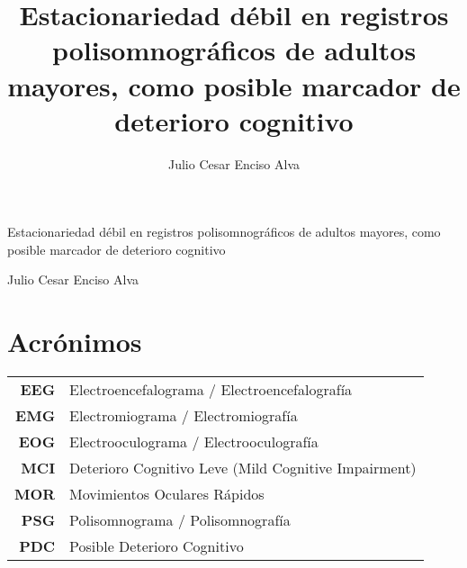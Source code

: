 \documentclass[12pt,a4paper]{mitthesis}
\begin{document}

\title{Estacionariedad d\'ebil en registros polisomnogr\'aficos de adultos mayores,
como posible marcador de deterioro cognitivo}
%
\author{Julio Cesar Enciso Alva}

\begin{center}
\huge{Estacionariedad d\'ebil en registros polisomnogr\'aficos de adultos mayores,
como posible marcador de deterioro cognitivo}


\Large{Julio Cesar Enciso Alva}
\end{center}

\newpage





\chapter*{Acr\'onimos}

\begin{tabular}{rl}
\textbf{EEG} & Electroencefalograma / Electroencefalograf\'ia
\\
\textbf{EMG} & Electromiograma / Electromiograf\'ia
\\
\textbf{EOG} & Electrooculograma / Electrooculograf\'ia
\\
\textbf{MCI} & Deterioro Cognitivo Leve (Mild Cognitive Impairment)
\\
\textbf{MOR} & Movimientos Oculares R\'apidos
\\
\textbf{PSG} & Polisomnograma / Polisomnograf\'ia
\\
\textbf{PDC} & Posible Deterioro Cognitivo
\end{tabular}

\newpage


\tableofcontents
\newpage


%
\end{document}
